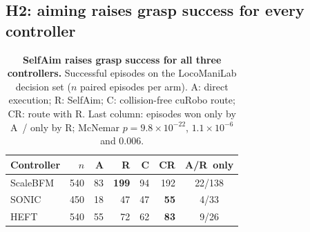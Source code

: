 \documentclass[conference]{IEEEtran}
\newcommand{\Ad}{\textsc{A}}       %
\newcommand{\Rr}{\textsc{R}}       %
\newcommand{\Croute}{\textsc{C}}   %
\newcommand{\CRr}{\textsc{CR}}     %
\begin{document}
\subsection{H2: aiming raises grasp success for every controller}
\begin{table}[t]
\centering
\caption{\textbf{SelfAim raises grasp success for all three controllers.} Successful episodes on the LocoManiLab decision set ($n$ paired episodes per arm). \Ad: direct execution; \Rr: SelfAim; \Croute: collision-free cuRobo route; \CRr: route with \Rr. Last column: episodes won only by \Ad\ / only by \Rr; McNemar $p=9.8\times10^{-22}$, $1.1\times10^{-6}$ and $0.006$.}
\label{tab:lml}
\begin{tabular}{lrrrrrc}
\toprule
Controller & $n$ & \Ad & \Rr & \Croute & \CRr & \Ad/\Rr\ only \\
\midrule
ScaleBFM & 540 & 83 & \textbf{199} & 94 & 192 & 22/138 \\
SONIC    & 450 & 18 & 47 & 47 & \textbf{55} & 4/33 \\
HEFT     & 540 & 55 & 72 & 62 & \textbf{83} & 9/26 \\
\bottomrule
\end{tabular}
\end{table}
\end{document}
